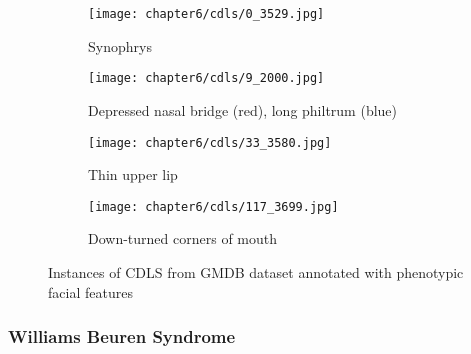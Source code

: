 \documentclass[../report.tex]{subfiles}
\begin{document}
	\begin{figure}[H]\label{fig_cdls}
		\centering
		\begin{subfigure}[t]{0.24\textwidth}
			\centering
			\texttt{[image: chapter6/cdls/0\_3529.jpg]}
			\caption{Synophrys}
		\end{subfigure}
		\begin{subfigure}[t]{0.24\textwidth}
			\centering
			\texttt{[image: chapter6/cdls/9\_2000.jpg]}
			\caption{Depressed nasal bridge (red), long philtrum (blue)}
		\end{subfigure}	
		\begin{subfigure}[t]{0.24\textwidth}
			\centering
			\texttt{[image: chapter6/cdls/33\_3580.jpg]}
			\caption{Thin upper lip}
		\end{subfigure}	
		\begin{subfigure}[t]{0.24\textwidth}
			\centering
			\texttt{[image: chapter6/cdls/117\_3699.jpg]}
			\caption{Down-turned corners of mouth}
		\end{subfigure}
		\caption[Instances of CDLS from GMDB dataset]{Instances of CDLS from GMDB dataset annotated with phenotypic facial features}
	\end{figure}
	
	\subsubsection{Williams Beuren Syndrome}
	
\end{document}
